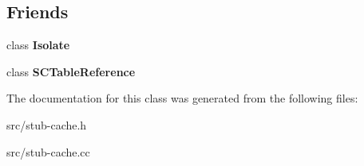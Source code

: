 \subsection*{Friends}
\begin{DoxyCompactItemize}
\item 
\hypertarget{classv8_1_1internal_1_1_stub_cache_aba4f0964bdacf2bbf62cf876e5d28d0a}{}class {\bfseries Isolate}\label{classv8_1_1internal_1_1_stub_cache_aba4f0964bdacf2bbf62cf876e5d28d0a}

\item 
\hypertarget{classv8_1_1internal_1_1_stub_cache_ad842275e288fccee190c3166f1bc3eed}{}class {\bfseries S\+C\+Table\+Reference}\label{classv8_1_1internal_1_1_stub_cache_ad842275e288fccee190c3166f1bc3eed}

\end{DoxyCompactItemize}


The documentation for this class was generated from the following files\+:\begin{DoxyCompactItemize}
\item 
src/stub-\/cache.\+h\item 
src/stub-\/cache.\+cc\end{DoxyCompactItemize}
